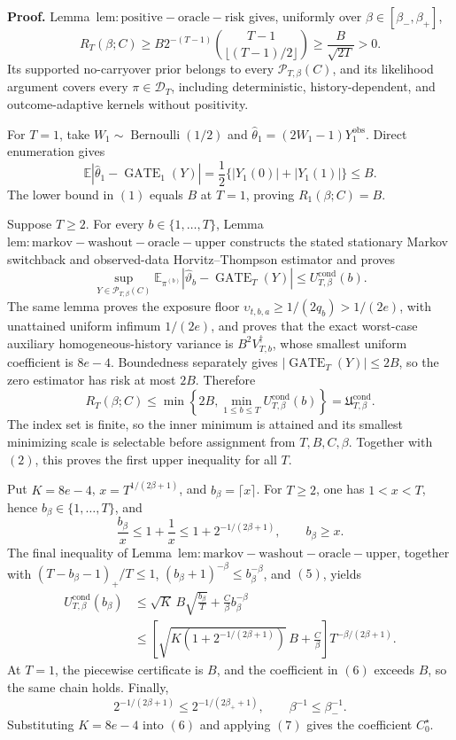 \textbf{Proof.} Lemma~\(\mathrm{lem:positive-oracle-risk}\) gives, uniformly over \(\beta\in[\beta_-,\beta_+]\),
\[
R_T(\beta;C)\ge B2^{-(T-1)}\binom{T-1}{\lfloor(T-1)/2\rfloor}\ge\frac{B}{\sqrt{2T}}>0.
\tag{1}
\]
Its supported no-carryover prior belongs to every \(\mathcal P_{T,\beta}(C)\), and its likelihood argument covers every \(\pi\in\mathcal D_T\), including deterministic, history-dependent, and outcome-adaptive kernels without positivity.

For \(T=1\), take \(W_1\sim\operatorname{Bernoulli}(1/2)\) and \(\widehat\theta_1=(2W_1-1)Y_1^{\mathrm{obs}}\). Direct enumeration gives
\[
\mathbb E\left|\widehat\theta_1-\operatorname{GATE}_1(Y)\right|
=\frac12\bigl\{|Y_1(0)|+|Y_1(1)|\bigr\}\le B.
\tag{2}
\]
The lower bound in \((1)\) equals \(B\) at \(T=1\), proving \(R_1(\beta;C)=B\).

Suppose \(T\ge2\). For every \(b\in\{1,\ldots,T\}\), Lemma~\(\mathrm{lem:markov-washout-oracle-upper}\) constructs the stated stationary Markov switchback and observed-data Horvitz--Thompson estimator and proves
\[
\sup_{Y\in\mathcal P_{T,\beta}(C)}
\mathbb E_{\pi^{(b)}}\left|\widehat\vartheta_b-\operatorname{GATE}_T(Y)\right|
\le U_{T,\beta}^{\mathrm{cond}}(b).
\tag{3}
\]
The same lemma proves the exposure floor \(\upsilon_{t,b,a}\ge1/(2q_b)>1/(2e)\), with unattained uniform infimum \(1/(2e)\), and proves that the exact worst-case auxiliary homogeneous-history variance is \(B^2V_{T,b}^{\dagger}\), whose smallest uniform coefficient is \(8e-4\). Boundedness separately gives \(|\operatorname{GATE}_T(Y)|\le2B\), so the zero estimator has risk at most \(2B\). Therefore
\[
R_T(\beta;C)
\le\min\left\{2B,\min_{1\le b\le T}U_{T,\beta}^{\mathrm{cond}}(b)\right\}
=\mathfrak U_{T,\beta}^{\mathrm{cond}}.
\tag{4}
\]
The index set is finite, so the inner minimum is attained and its smallest minimizing scale is selectable before assignment from \(T,B,C,\beta\). Together with \((2)\), this proves the first upper inequality for all \(T\).

Put \(K=8e-4\), \(x=T^{1/(2\beta+1)}\), and \(b_\beta=\lceil x\rceil\). For \(T\ge2\), one has \(1<x<T\), hence \(b_\beta\in\{1,\ldots,T\}\), and
\[
\frac{b_\beta}{x}\le1+\frac1x\le1+2^{-1/(2\beta+1)},
\qquad b_\beta\ge x.
\tag{5}
\]
The final inequality of Lemma~\(\mathrm{lem:markov-washout-oracle-upper}\), together with \((T-b_\beta-1)_+/T\le1\), \((b_\beta+1)^{-\beta}\le b_\beta^{-\beta}\), and \((5)\), yields
\[
\begin{aligned}
U_{T,\beta}^{\mathrm{cond}}(b_\beta)
&\le\sqrt K\,B\sqrt{\frac{b_\beta}{T}}+\frac C\beta b_\beta^{-\beta}\\
&\le\left[\sqrt{K\left(1+2^{-1/(2\beta+1)}\right)}\,B+\frac C\beta\right]T^{-\beta/(2\beta+1)}.
\end{aligned}
\tag{6}
\]
At \(T=1\), the piecewise certificate is \(B\), and the coefficient in \((6)\) exceeds \(B\), so the same chain holds. Finally,
\[
2^{-1/(2\beta+1)}\le2^{-1/(2\beta_++1)},
\qquad \beta^{-1}\le\beta_-^{-1}.
\tag{7}
\]
Substituting \(K=8e-4\) into \((6)\) and applying \((7)\) gives the coefficient \(C_0^\star\).

